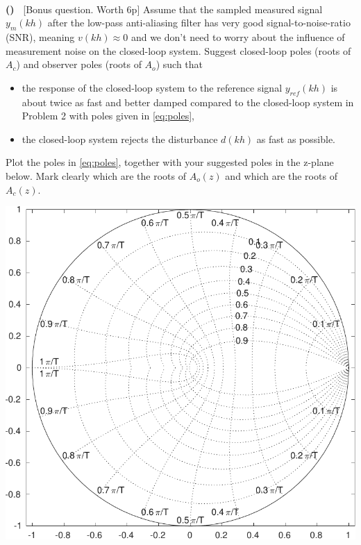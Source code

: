 \documentclass[letterpaper,12pt]{scrartcl}
\newenvironment{exercise}[1][Problem]{\begin{trivlist} \item[\hskip
    \labelsep {\stepcounter{exerctr}\bfseries #1
      \arabic{exerctr}}]}{\end{trivlist}\vspace{10mm}}
\newcounter{exerctr}
\newcounter{abcctr}[exerctr]
\newcommand{\abc}{\noindent\vspace{1mm}\\ {\bf
    \stepcounter{abcctr}(\alph{abcctr})\ }}
\begin{document}
\begin{exercise}
\abc
[Bonus question. Worth 6p]
Assume that the sampled measured signal $y_m(kh)$ after the low-pass anti-aliasing filter has very good signal-to-noise-ratio (SNR), meaning $v(kh) \approx 0$ and we don't need to worry about the influence of measurement noise on the closed-loop system. Suggest closed-loop poles (roots of $A_c$) and observer poles (roots of $A_o$) such that 
\begin{itemize}
\item the response of the closed-loop system to the reference signal $y_{ref}(kh)$ is about twice as fast and better damped compared to the closed-loop system in Problem 2 with poles given in \eqref{eq:poles},    
\item the closed-loop system rejects the disturbance $d(kh)$ as fast as possible.
\end{itemize}
Plot the poles in \eqref{eq:poles}, together with your suggested poles in the z-plane below. Mark clearly which are the roots of $A_o(z)$ and which are the roots of $A_c(z)$.   
\begin{center}
  \includegraphics[width=0.6\linewidth]{../../figures/zgrid-crop}
\end{center}

\end{exercise}
\end{document}

